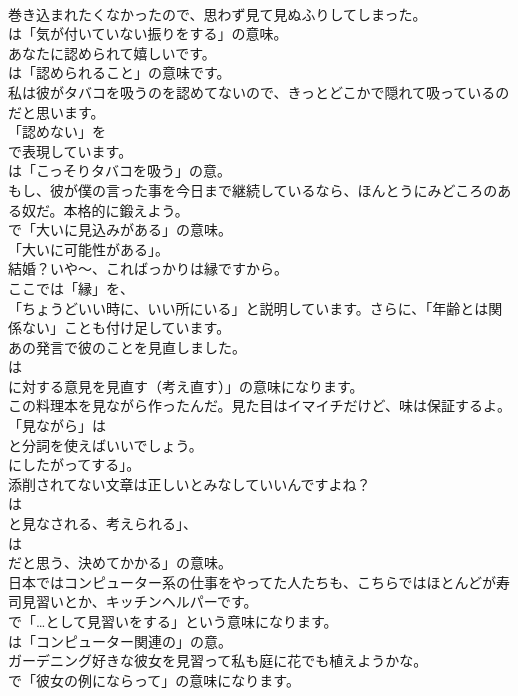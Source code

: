 \documentclass[8pt]{extreport}
\begin{document}
\begin{CJK}{UTF8}{min}
\\	巻き込まれたくなかったので、思わず見て見ぬふりしてしまった。 
\\	は「気が付いていない振りをする」の意味。	
\\	あなたに認められて嬉しいです。 
\\	は「認められること」の意味です。	
\\	私は彼がタバコを吸うのを認めてないので、きっとどこかで隠れて吸っているのだと思います。 
\\	「認めない」を 
\\	で表現しています。
\\	は「こっそりタバコを吸う」の意。	
\\	もし、彼が僕の言った事を今日まで継続しているなら、ほんとうにみどころのある奴だ。本格的に鍛えよう。 
\\	で「大いに見込みがある」の意味。
\\	「大いに可能性がある」。	
\\	結婚？いや～、こればっかりは縁ですから。 
\\	ここでは「縁」を、
\\	「ちょうどいい時に、いい所にいる」と説明しています。さらに、「年齢とは関係ない」ことも付け足しています。	
\\	あの発言で彼のことを見直しました。 
\\	は
\\	に対する意見を見直す（考え直す）」の意味になります。	
\\	この料理本を見ながら作ったんだ。見た目はイマイチだけど、味は保証するよ。 
\\	「見ながら」は
\\	と分詞を使えばいいでしょう。
\\	にしたがってする」。	
\\	添削されてない文章は正しいとみなしていいんですよね？ 
\\	は
\\	と見なされる、考えられる」、
\\	は
\\	だと思う、決めてかかる」の意味。	
\\	日本ではコンピューター系の仕事をやってた人たちも、こちらではほとんどが寿司見習いとか、キッチンヘルパーです。 
\\	で「…として見習いをする」という意味になります。
\\	は「コンピューター関連の」の意。	
\\	ガーデニング好きな彼女を見習って私も庭に花でも植えようかな。 
\\	で「彼女の例にならって」の意味になります。	

\end{CJK}
\end{document}
